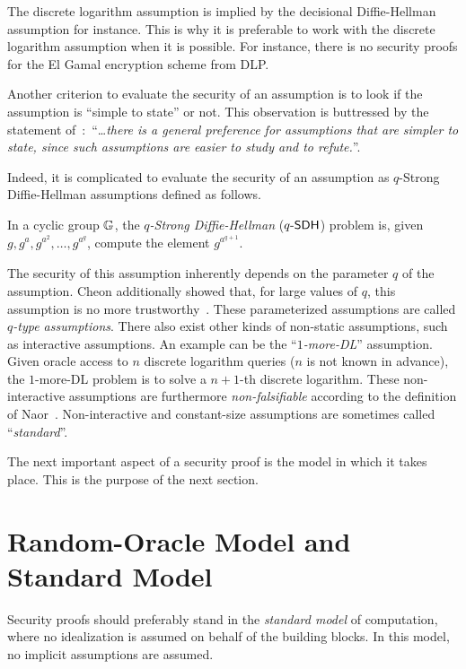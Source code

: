 The discrete logarithm assumption is implied by the decisional Diffie-Hellman assumption for instance.
This is why it is preferable to work with the discrete logarithm assumption when it is possible.
For instance, there is no security proofs for the El Gamal encryption scheme from DLP.

Another criterion to evaluate the security of an assumption is to look if the assumption is ``simple to state'' or not.
This observation is buttressed by the statement of~\cite[p.25]{KL07}:~``\ldots\textit{there  is  a  general  preference  for  assumptions  that are simpler to state, since such assumptions are easier to study and to refute.}''.

Indeed, it is complicated to evaluate the security of an assumption as $q$-Strong Diffie-Hellman assumptions defined as follows.
\begin{definition}
  In a cyclic group $\mathbb{G}$, the $q$\textit{-Strong Diffie-Hellman} ($\textsf{$q$-SDH}$) problem is, given $g, g^a_{}, g^{a^2}_{}, \ldots, g^{a^q}_{}$, compute the element $g^{a^{q+1}}$.
\end{definition}
The security of this assumption inherently depends on the parameter $q$ of the assumption.
Cheon additionally showed that, for large values of $q$, this assumption is no more trustworthy~\cite{Che06}.
These parameterized assumptions are called \emph{$q$-type assumptions}.
There also exist other kinds of non-static assumptions, such as interactive assumptions.
An example can be the ``\emph{$1$-more-\textsf{DL}}'' assumption.
Given oracle access to $n$ discrete logarithm queries ($n$ is not known in advance), the $1$-more-\textsf{DL} problem is to solve a $n+1$-th discrete logarithm.
These non-interactive assumptions are furthermore \textit{non-falsifiable} according to the definition of Naor~\cite{Nao03}.
Non-interactive and constant-size assumptions are sometimes called ``\textit{standard}''.

The next important aspect of a security proof is the model in which it takes place.
This is the purpose of the next section.

\section{Random-Oracle Model and Standard Model} \label{se:models}

Security proofs should preferably stand in the \textit{standard model} of computation, where no idealization is assumed on behalf of the building blocks.
In this model, no implicit assumptions are assumed.

